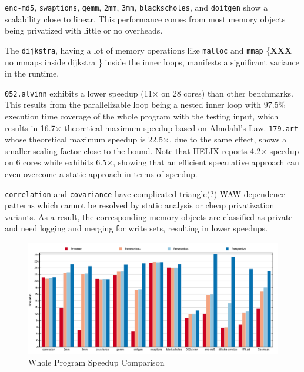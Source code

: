 \texttt{enc-md5}, \texttt{swaptions}, \texttt{gemm}, \texttt{2mm},
\texttt{3mm}, \texttt{blackscholes}, and \texttt{doitgen} show a
scalability close to linear. This performance comes from most memory
objects being privatized with little or no overheads.

The \texttt{dijkstra}, having a lot of memory operations like
\texttt{malloc} and \texttt{mmap} \{\textbf{XXX} no mmaps inside dijkstra \}
inside the inner loops, manifests a
significant variance in the runtime.

\texttt{052.alvinn} exhibits a lower speedup (11$\times$ on 28
cores) than other benchmarks. This results from the parallelizable loop
being a nested inner loop with 97.5\% execution time coverage of the whole
program with the testing input, which results in 16.7$\times$
theoretical maximum speedup based on Almdahl's Law.
\texttt{179.art} whose theoretical maximum speedup is 22.5$\times$, due to
the same effect, shows a smaller scaling factor close to the bound. Note
that HELIX\cite{simone:12:cgo} reports 4.2$\times$ speedup on 6 cores while
\name exhibits 6.5$\times$, showing that an efficient speculative approach
can even overcome a static approach in terms of speedup.

\texttt{correlation} and \texttt{covariance} have complicated triangle(?) WAW
dependence patterns which cannot be resolved by static analysis or cheap
privatization variants. As a result, the corresponding memory objects are
classified as private and need logging and merging for write sets,
resulting in lower speedups.

\begin{figure}[ht]
  \includegraphics[width=\textwidth]{figures/compare-privateer}
  \caption{Whole Program Speedup Comparison}
  \label{fig:speedup-compare}
\end{figure}

